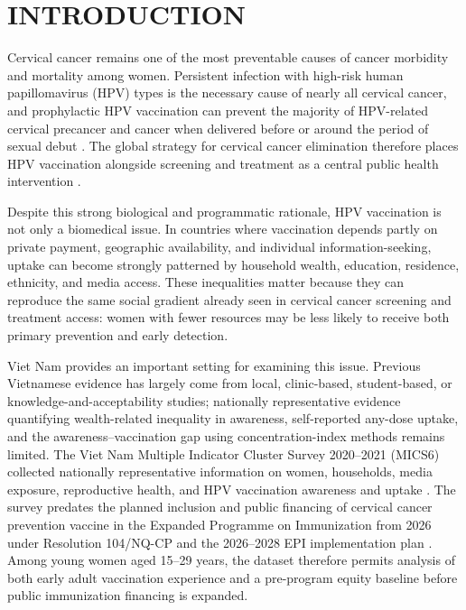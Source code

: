 \chapter*{INTRODUCTION}
{}

Cervical cancer remains one of the most preventable causes of cancer morbidity and mortality among women. Persistent infection with high-risk human papillomavirus (HPV) types is the necessary cause of nearly all cervical cancer, and prophylactic HPV vaccination can prevent the majority of HPV-related cervical precancer and cancer when delivered before or around the period of sexual debut \cite{schiffman2016,who2022hpv}. The global strategy for cervical cancer elimination therefore places HPV vaccination alongside screening and treatment as a central public health intervention \cite{who2020strategy}.

Despite this strong biological and programmatic rationale, HPV vaccination is not only a biomedical issue. In countries where vaccination depends partly on private payment, geographic availability, and individual information-seeking, uptake can become strongly patterned by household wealth, education, residence, ethnicity, and media access. These inequalities matter because they can reproduce the same social gradient already seen in cervical cancer screening and treatment access: women with fewer resources may be less likely to receive both primary prevention and early detection.

Viet Nam provides an important setting for examining this issue. Previous Vietnamese evidence has largely come from local, clinic-based, student-based, or knowledge-and-acceptability studies; nationally representative evidence quantifying wealth-related inequality in awareness, self-reported any-dose uptake, and the awareness--vaccination gap using concentration-index methods remains limited.  The Viet Nam Multiple Indicator Cluster Survey 2020--2021 (MICS6) collected nationally representative information on women, households, media exposure, reproductive health, and HPV vaccination awareness and uptake \cite{unicef2022}. The survey predates the planned inclusion and public financing of cervical cancer prevention vaccine in the Expanded Programme on Immunization from 2026 under Resolution 104/NQ-CP and the 2026--2028 EPI implementation plan \cite{govvn2022nq104,baochinhphu2025epi}. Among young women aged 15--29 years, the dataset therefore permits analysis of both early adult vaccination experience and a pre-program equity baseline before public immunization financing is expanded.

